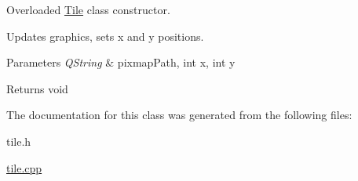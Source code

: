 Overloaded \mbox{\hyperlink{class_tile}{Tile}} class constructor. 

Updates graphics, sets x and y positions. 
\begin{DoxyParams}{Parameters}
{\em Q\+String} & pixmap\+Path, int x, int y \\
\hline
\end{DoxyParams}
\begin{DoxyReturn}{Returns}
void 
\end{DoxyReturn}


The documentation for this class was generated from the following files\+:\begin{DoxyCompactItemize}
\item 
tile.\+h\item 
\mbox{\hyperlink{tile_8cpp}{tile.\+cpp}}\end{DoxyCompactItemize}
